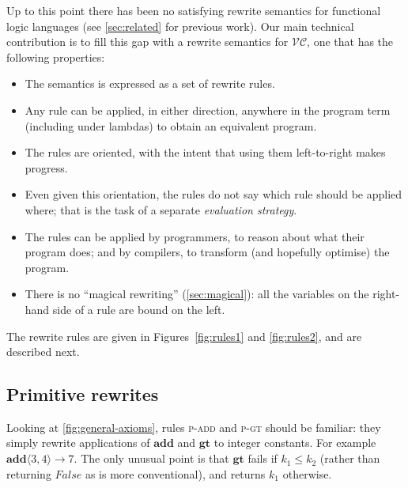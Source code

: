 \documentclass[acmsmall,review,dvipsnames]{acmart}
\newcommand{\Conid}[1]{\mathit{#1}}
\newcommand{\Varid}[1]{\mathit{#1}}
\renewcommand{\leq}{\leqslant}
\newcommand{\versecalc}{$\mathcal{VC}$}
\newcommand{\rulename}[1]{\textsc{\small #1}}
\newcommand{\movesto}{\longrightarrow}
\begin{document}
Up to this point there has been no satisfying rewrite semantics for functional logic languages
(see \cref{sec:related} for previous work).
Our main technical contribution is to fill this gap with a rewrite semantics for \versecalc{}, one that
has the following properties:
\begin{itemize}
\item The semantics is expressed as a set of rewrite rules.
\item Any rule can be applied, in either direction,
  anywhere in the program term (including under lambdas) to obtain an equivalent program.
\item The rules are oriented, with the intent that using them left-to-right makes progress.
\item Even given this orientation, the rules do not say which rule should be
  applied where; that is the task of a separate \emph{evaluation strategy}.
\item The rules can be applied by programmers, to reason about what their program does;
  and by compilers, to transform (and hopefully optimise) the program.
\item There is no ``magical rewriting'' (\cref{sec:magical}): all the variables on the
  right-hand side of a rule are bound on the left.
\end{itemize}

The rewrite rules are given in Figures~\ref{fig:rules1} and \ref{fig:rules2},
and are described next.

\figureRulesI
\figureContexts


\subsection{Primitive rewrites}

Looking at \cref{fig:general-axioms}, rules \rulename{p-add} and \rulename{p-gt}
should be familiar: they simply rewrite applications of \ensuremath{\textbf{add}} and \ensuremath{\textbf{gt}} to integer
constants.  For example $\ensuremath{\textbf{add}\langle\mathrm{3},\mathrm{4}\rangle} \movesto \ensuremath{\mathrm{7}}$.  The only unusual point is
that \ensuremath{\textbf{gt}} fails if $k_1 \leq k_2$ (rather than returning \ensuremath{\Conid{False}} as is more conventional),
and returns \ensuremath{\Varid{k}_{\mathrm{1}}} otherwise.

\end{document}
